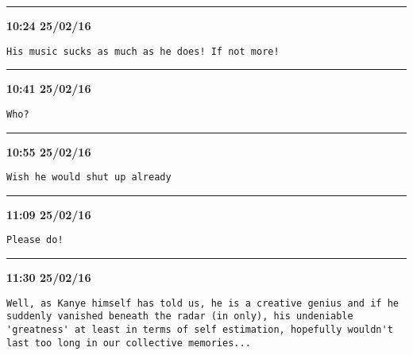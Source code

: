 \hrule%

\begin{adjustwidth}{0cm}{0cm}
\footnotesize \textbf{10:24 25/02/16}

\begin{lstlisting}[breaklines, breakatwhitespace, basicstyle=\small, frame=leftline]
His music sucks as much as he does! If not more!
\end{lstlisting}
\end{adjustwidth}

\hrule%

\begin{adjustwidth}{0cm}{0cm}
\footnotesize \textbf{10:41 25/02/16}

\begin{lstlisting}[breaklines, breakatwhitespace, basicstyle=\small, frame=leftline]
Who?
\end{lstlisting}
\end{adjustwidth}

\hrule%

\begin{adjustwidth}{0cm}{0cm}
\footnotesize \textbf{10:55 25/02/16}

\begin{lstlisting}[breaklines, breakatwhitespace, basicstyle=\small, frame=leftline]
Wish he would shut up already
\end{lstlisting}
\end{adjustwidth}

\hrule%

\begin{adjustwidth}{0cm}{0cm}
\footnotesize \textbf{11:09 25/02/16}

\begin{lstlisting}[breaklines, breakatwhitespace, basicstyle=\small, frame=leftline]
Please do!
\end{lstlisting}
\end{adjustwidth}

\hrule%

\begin{adjustwidth}{0cm}{0cm}
\footnotesize \textbf{11:30 25/02/16}

\begin{lstlisting}[breaklines, breakatwhitespace, basicstyle=\small, frame=leftline]
Well, as Kanye himself has told us, he is a creative genius and if he suddenly vanished beneath the radar (in only), his undeniable 'greatness' at least in terms of self estimation, hopefully wouldn't last too long in our collective memories...
\end{lstlisting}
\end{adjustwidth}

